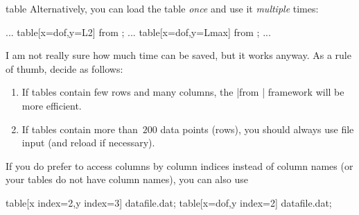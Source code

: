 \begin{addplotoperation}[]{table}{}
Alternatively, you can load the table \emph{once} and use it \emph{multiple} times:
\begin{codeexample}
\table
...
\addplot table[x=dof,y=L2] from \table;
...
\addplot table[x=dof,y=Lmax] from \table;
...
\end{codeexample}
I am not really sure how much time can be saved, but it works anyway. As a rule of thumb, decide as follows:
\begin{enumerate}
	\item If tables contain few rows and many columns, the |from | framework will be more efficient.
	\item If tables contain more than~$200$ data points (rows), you should always use file input (and reload if necessary).
\end{enumerate}

If you do prefer to access columns by column indices instead of column names (or your tables do not have column names), you can also use
\begin{codeexample}
\addplot table[x index=2,y index=3] {datafile.dat};
\addplot table[x=dof,y index=2] {datafile.dat};
\end{codeexample}


\end{addplotoperation}
